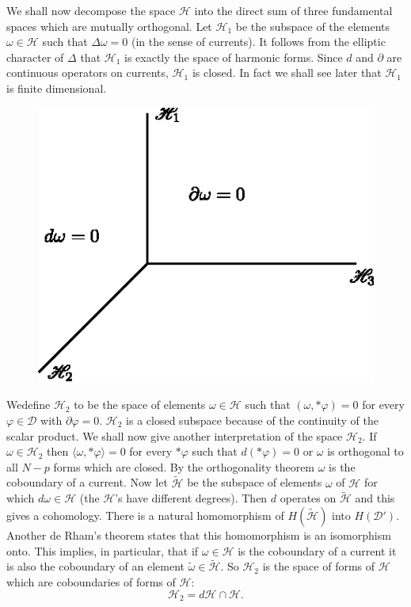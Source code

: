 We shall now decompose the space $\mathscr{H}$ into the direct sum of
three fundamental spaces which are mutually orthogonal. Let
$\mathscr{H}_{1}$ be the subspace of the elements $\omega\in
\mathscr{H}$ such that $\Delta\omega=0$ (in the sense of currents). It
follows from the elliptic character of $\Delta$ that $\mathscr{H}_{1}$
is exactly the space of harmonic forms. Since $d$ and $\partial$ are
continuous operators on currents, $\mathscr{H}_{1}$ is closed. In fact
we shall see later that $\mathscr{H}_{1}$ is finite dimensional.
\begin{figure}[H]
\centering
\includegraphics{schwartz-fig1.eps}
\end{figure}
We\pageoriginale define $\mathscr{H}_{2}$ to be the space of elements
$\omega\in \mathscr{H}$ such that $(\omega,\ast\varphi)=0$ for every
$\varphi\in \mathscr{D}$ with $\partial\varphi=0$. $\mathscr{H}_{2}$
is a closed subspace because of the continuity of the scalar
product. We shall now give another interpretation of the space
$\mathscr{H}_{2}$. If $\omega\in
\mathscr{H}_{2}$ then $\langle \omega,\ast\varphi\rangle=0$ for every
$\ast\varphi$ such that $d(\ast\varphi)=0$ or $\omega$ is orthogonal
to all $N-p$ forms which are closed. By the orthogonality theorem
$\omega$ is the coboundary of a current. Now let
$\widetilde{\mathscr{H}}$ be the subspace of elements $\omega$ of
$\mathscr{H}$ for which $d\omega\in \mathscr{H}$ (the $\mathscr{H}$'s
have different degrees). Then $d$ operates on
$\widetilde{\mathscr{H}}$ and this gives a cohomology. There is a
natural homomorphism of $H(\widetilde{\mathscr{H}})$ into
$H(\mathscr{D}')$. Another de Rham's theorem states that this
homomorphism is an isomorphism onto. This implies, in particular, that
if $\omega\in\mathscr{H}$ is the coboundary of a current it is also
the coboundary of an element
$\widetilde{\omega}\in\widetilde{\mathscr{H}}$. So $\mathscr{H}_{2}$
is the space of forms of $\mathscr{H}$ which are coboundaries of forms
of $\mathscr{H}$: 
$$
\mathscr{H}_{2}=d\mathscr{H}\cap \mathscr{H}.
$$

